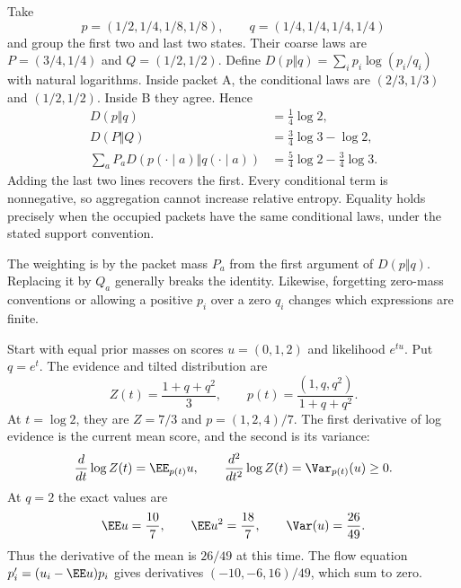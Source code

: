 Take
\[
p=(1/2,1/4,1/8,1/8),\qquad q=(1/4,1/4,1/4,1/4)
\]
and group the first two and last two states. Their coarse laws are $P=(3/4,1/4)$ and $Q=(1/2,1/2)$. Define $D(p\Vert q)=\sum_i p_i\log(p_i/q_i)$ with natural logarithms.
Inside packet A, the conditional laws are $(2/3,1/3)$ and $(1/2,1/2)$. Inside B they agree. Hence
\[
\begin{aligned}
D(p\Vert q)&=\tfrac14\log2,\\
D(P\Vert Q)&=\tfrac34\log3-\log2,\\
\sum_aP_aD(p(\cdot\mid a)\Vert q(\cdot\mid a))
&=\tfrac54\log2-\tfrac34\log3.
\end{aligned}
\]
Adding the last two lines recovers the first. Every conditional term is nonnegative, so aggregation cannot increase relative entropy. Equality holds precisely when the occupied packets have the same conditional laws, under the stated support convention.

The weighting is by the packet mass $P_a$ from the first argument of $D(p\Vert q)$. Replacing it by $Q_a$ generally breaks the identity. Likewise, forgetting zero-mass conventions or allowing a positive $p_i$ over a zero $q_i$ changes which expressions are finite.

Start with equal prior masses on scores $u=(0,1,2)$ and likelihood $e^{tu}$. Put $q=e^t$. The evidence and tilted distribution are
\[
Z(t)=\frac{1+q+q^2}{3},\qquad
p(t)=\frac{(1,q,q^2)}{1+q+q^2}.
\]
At $t=\log2$, they are $Z=7/3$ and $p=(1,2,4)/7$.
The first derivative of log evidence is the current mean score, and the second is its variance:
\[
\frac{d}{dt}\log Z(t)=\EE_{p(t)}u,
\qquad
\frac{d^2}{dt^2}\log Z(t)=\Var_{p(t)}(u)\ge0.
\]
At $q=2$ the exact values are
\[
\EE u=\frac{10}{7},\qquad
\EE u^2=\frac{18}{7},\qquad
\Var(u)=\frac{26}{49}.
\]
Thus the derivative of the mean is $26/49$ at this time. The flow equation $p_i'=(u_i-\EE u)p_i$ gives derivatives $(-10,-6,16)/49$, which sum to zero.

